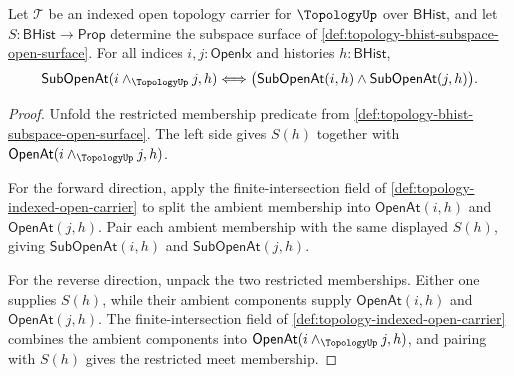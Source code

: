 \begin{theorem}
\label{thm:topology-subspace-finite-intersection-closure}
Let $\mathcal{T}$ be an indexed open topology carrier for $\TopologyUp$ over $\mathsf{BHist}$, and let $S:\mathsf{BHist}\to\mathsf{Prop}$ determine the subspace surface of \autoref{def:topology-bhist-subspace-open-surface}. For all indices $i,j:\mathsf{OpenIx}$ and histories $h:\mathsf{BHist}$,
$$
\mathsf{SubOpenAt}(i\wedge_{\TopologyUp}j,h)
\Longleftrightarrow
\bigl(\mathsf{SubOpenAt}(i,h)\wedge\mathsf{SubOpenAt}(j,h)\bigr).
$$
\end{theorem}
\begin{proof}
Unfold the restricted membership predicate from \autoref{def:topology-bhist-subspace-open-surface}. The left side gives $S(h)$ together with $\mathsf{OpenAt}(i\wedge_{\TopologyUp}j,h)$.

For the forward direction, apply the finite-intersection field of \autoref{def:topology-indexed-open-carrier} to split the ambient membership into $\mathsf{OpenAt}(i,h)$ and $\mathsf{OpenAt}(j,h)$. Pair each ambient membership with the same displayed $S(h)$, giving $\mathsf{SubOpenAt}(i,h)$ and $\mathsf{SubOpenAt}(j,h)$.

For the reverse direction, unpack the two restricted memberships. Either one supplies $S(h)$, while their ambient components supply $\mathsf{OpenAt}(i,h)$ and $\mathsf{OpenAt}(j,h)$. The finite-intersection field of \autoref{def:topology-indexed-open-carrier} combines the ambient components into $\mathsf{OpenAt}(i\wedge_{\TopologyUp}j,h)$, and pairing with $S(h)$ gives the restricted meet membership.
\end{proof}

